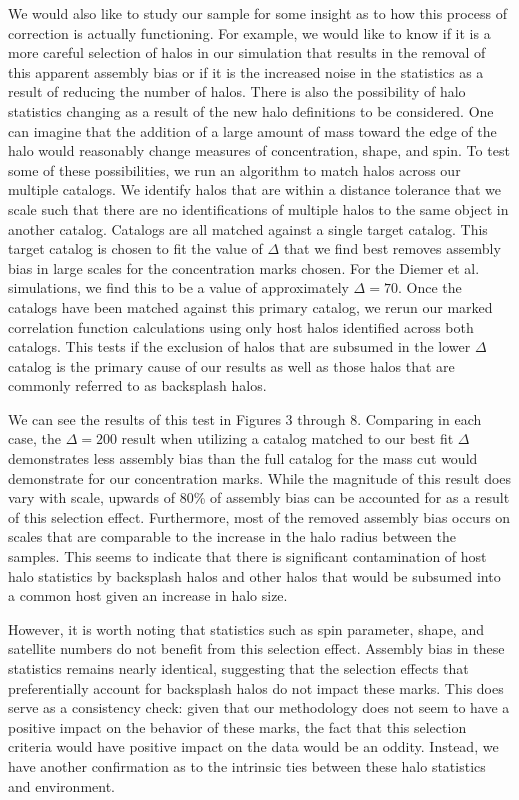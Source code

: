 \documentclass[usenatbib,usegraphicx,letterpaper]{mn2e}
\begin{document}
We would also like to study our sample for some insight as to how this process of correction is actually functioning. For example, we would like to know if it is a more careful selection of halos in our simulation that results in the removal of this apparent assembly bias or if it is the increased noise in the statistics as a result of reducing the number of halos. There is also the possibility of halo statistics changing as a result of the new halo definitions to be considered. One can imagine that the addition of a large amount of mass toward the edge of the halo would reasonably change measures of concentration, shape, and spin. To test some of these possibilities, we run an algorithm to match halos across our multiple catalogs. We identify halos that are within a distance tolerance that we scale such that there are no identifications of multiple halos to the same object in another catalog. Catalogs are all matched against a single target catalog. This target catalog is chosen to fit the value of $\Delta$ that we find best removes assembly bias in large scales for the concentration marks chosen. For the Diemer et al. simulations, we find this to be a value of approximately $\Delta = 70$. Once the catalogs have been matched against this primary catalog, we rerun our marked correlation function calculations using only host halos identified across both catalogs. This tests if the exclusion of halos that are subsumed in the lower $\Delta$ catalog is the primary cause of our results as well as those halos that are commonly referred to as backsplash halos.

We can see the results of this test in Figures 3 through 8. Comparing in each case, the $\Delta = 200$ result when utilizing a catalog matched to our best fit $\Delta$ demonstrates less assembly bias than the full catalog for the mass cut would demonstrate for our concentration marks. While the magnitude of this result does vary with scale, upwards of 80\% of assembly bias can be accounted for as a result of this selection effect. Furthermore, most of the removed assembly bias occurs on scales that are comparable to the increase in the halo radius between the samples. This seems to indicate that there is significant contamination of host halo statistics by backsplash halos and other halos that would be subsumed into a common host given an increase in halo size.

However, it is worth noting that statistics such as spin parameter, shape, and satellite numbers do not benefit from this selection effect. Assembly bias in these statistics remains nearly identical, suggesting that the selection effects that preferentially account for backsplash halos do not impact these marks. This does serve as a consistency check: given that our methodology does not seem to have a positive impact on the behavior of these marks, the fact that this selection criteria would have positive impact on the data would be an oddity. Instead, we have another confirmation as to the intrinsic ties between these halo statistics and environment.
\end{document}

